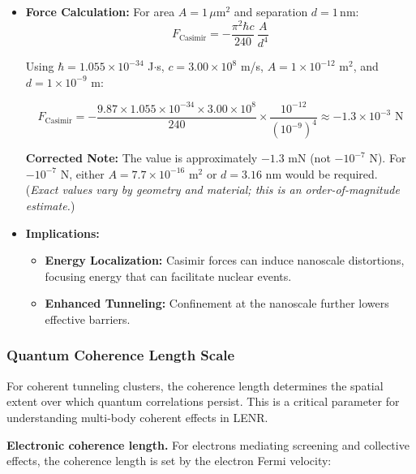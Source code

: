 \documentclass[11pt,a4paper]{article}
\begin{document}
\begin{itemize}
\item
  \textbf{Force Calculation:} For area $A = 1\,\mu\text{m}^2$ and separation $d = 1\,\text{nm}$: \begin{equation}
F_{\text{Casimir}} = -\frac{\pi^2 \hbar c}{240}\,\frac{A}{d^4}
\end{equation}

  Using $\hbar = 1.055 \times 10^{-34}$ J$\cdot$s, $c = 3.00 \times 10^8$ m/s, $A = 1 \times 10^{-12}$ m$^{2}$, and $d = 1 \times 10^{-9}$ m:

  \begin{equation}
F_{\text{Casimir}} = -\frac{9.87 \times 1.055 \times 10^{-34} \times 3.00 \times 10^8}{240} \times \frac{10^{-12}}{(10^{-9})^4} \approx -1.3 \times 10^{-3} \text{ N}
\end{equation}

  \textbf{Corrected Note:} The value is approximately $-1.3$ mN (not $-10^{-7}$ N). For $-10^{-7}$ N, either $A = 7.7 \times 10^{-16}$ m$^{2}$ or $d = 3.16$ nm would be required.\\
  (\emph{Exact values vary by geometry and material; this is an order-of-magnitude estimate.})
\item
  \textbf{Implications:}

  \begin{itemize}
    \item
    \textbf{Energy Localization:} Casimir forces can induce nanoscale distortions, focusing energy that can facilitate nuclear events.\\
  \item
    \textbf{Enhanced Tunneling:} Confinement at the nanoscale further lowers effective barriers.
  \end{itemize}
\end{itemize}

\subsubsection{Quantum Coherence Length Scale}

For coherent tunneling clusters, the coherence length determines the spatial extent over which quantum correlations persist. This is a critical parameter for understanding multi-body coherent effects in LENR.

\textbf{Electronic coherence length.} For electrons mediating screening and collective effects, the coherence length is set by the electron Fermi velocity:
\end{document}

